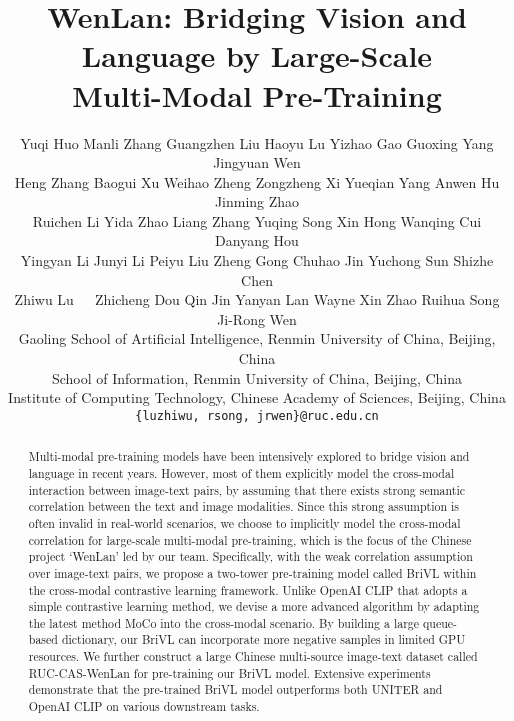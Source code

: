 \documentclass[10pt,twocolumn,letterpaper]{article}
\begin{document}
\title{WenLan: Bridging Vision and Language by Large-Scale \\ Multi-Modal Pre-Training }

\author{
Yuqi Huo Manli Zhang Guangzhen Liu Haoyu Lu Yizhao Gao Guoxing Yang Jingyuan Wen\\
Heng Zhang Baogui Xu Weihao Zheng Zongzheng Xi Yueqian Yang Anwen Hu Jinming Zhao \\ 
Ruichen Li Yida Zhao Liang Zhang Yuqing Song Xin Hong Wanqing Cui Danyang Hou\\
Yingyan Li Junyi Li Peiyu Liu Zheng Gong  Chuhao Jin Yuchong Sun Shizhe Chen\\
Zhiwu Lu~~~Zhicheng Dou Qin Jin Yanyan Lan Wayne Xin Zhao Ruihua Song Ji-Rong Wen\\
Gaoling School of Artificial Intelligence, Renmin University of China, Beijing, China\\
School of Information, Renmin University of China, Beijing, China\\
Institute of Computing Technology, Chinese Academy of Sciences, Beijing, China\\
{\tt\small \{luzhiwu, rsong, jrwen\}@ruc.edu.cn}
}

\maketitle

\begin{abstract}
Multi-modal pre-training models have been intensively explored to bridge vision and language in recent years. However, most of them explicitly model the cross-modal interaction between image-text pairs, by assuming that there exists strong semantic correlation between the text and image modalities. Since this strong assumption is often invalid in real-world scenarios, we choose to implicitly model the cross-modal correlation for large-scale multi-modal pre-training, which is the focus of the Chinese project `WenLan' led by our team. Specifically, with the weak correlation assumption over image-text pairs, we propose a two-tower pre-training model called BriVL within the cross-modal contrastive learning framework. Unlike OpenAI CLIP that adopts a simple contrastive learning method, we devise a more advanced algorithm by adapting the latest method MoCo into the cross-modal scenario. By building a large queue-based dictionary, our BriVL can incorporate more negative samples in limited GPU resources. We further construct a large Chinese multi-source image-text dataset called RUC-CAS-WenLan for pre-training our BriVL model. Extensive experiments demonstrate that the pre-trained BriVL model outperforms both UNITER and OpenAI CLIP on various downstream tasks.
\end{abstract}
\end{document}
